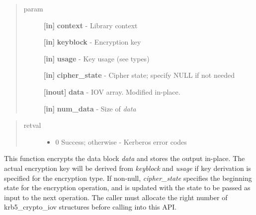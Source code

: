\documentclass[letterpaper,10pt,english]{sphinxmanual}
\begin{document}
\begin{fulllineitems}
\label{appdev/refs/api/krb5_c_encrypt_iov:c.krb5_c_encrypt_iov}
\end{fulllineitems}

\begin{quote}\begin{description}
\item[{param}] \leavevmode
\textbf{{[}in{]}} \textbf{context} - Library context

\textbf{{[}in{]}} \textbf{keyblock} - Encryption key

\textbf{{[}in{]}} \textbf{usage} - Key usage (see  types)

\textbf{{[}in{]}} \textbf{cipher\_state} - Cipher state; specify NULL if not needed

\textbf{{[}inout{]}} \textbf{data} - IOV array. Modified in-place.

\textbf{{[}in{]}} \textbf{num\_data} - Size of \emph{data}

\end{description}\end{quote}
\begin{quote}\begin{description}
\item[{retval}] \leavevmode\begin{itemize}
\item {} 
0   Success; otherwise - Kerberos error codes

\end{itemize}

\end{description}\end{quote}

This function encrypts the data block \emph{data} and stores the output in-place. The actual encryption key will be derived from \emph{keyblock} and \emph{usage} if key derivation is specified for the encryption type. If non-null, \emph{cipher\_state} specifies the beginning state for the encryption operation, and is updated with the state to be passed as input to the next operation. The caller must allocate the right number of krb5\_crypto\_iov structures before calling into this API.
\end{document}
